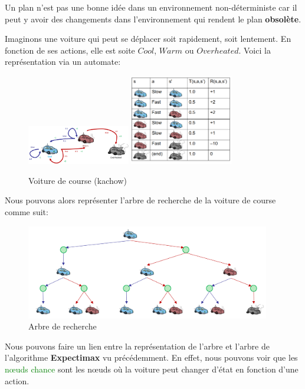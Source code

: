 \begin{remark}\leavevmode
    Un plan n'est pas une bonne idée dans un environnement non-déterministe car il peut y avoir des 
    changements dans l'environnement qui rendent le plan \textbf{obsolète}.
\end{remark}

\begin{example}\leavevmode
    Imaginons une voiture qui peut se déplacer soit rapidement, soit lentement. 
    En fonction de ses actions, elle est soite $Cool$, $Warm$ ou $Overheated$.
    Voici la représentation via un automate: 
    \begin{figure}[H]
        \centering
        \includegraphics[width=0.4\textwidth]{pictures/automateracing.png}
        \hspace{2cm}
        \includegraphics[width=0.4\textwidth]{pictures/tableracing.png}
        \caption{Voiture de course (kachow)}\label{fig:automateracing}
    \end{figure}

\end{example}

Nous pouvons alors représenter l'arbre de recherche de la voiture de course comme suit: 
\begin{figure}[H]
    \centering
    \includegraphics[width=0.95\textwidth]{pictures/racingtree.png}
    \caption{Arbre de recherche}\label{fig:racingtree}
\end{figure}
Nous pouvons faire un lien entre la représentation de l'arbre et l'arbre de l'algorithme \textbf{Expectimax} 
vu précédemment. En effet, nous pouvons voir que les \textcolor{green}{nœuds chance} sont les nœuds où la voiture peut 
changer d'état en fonction d'une action.

